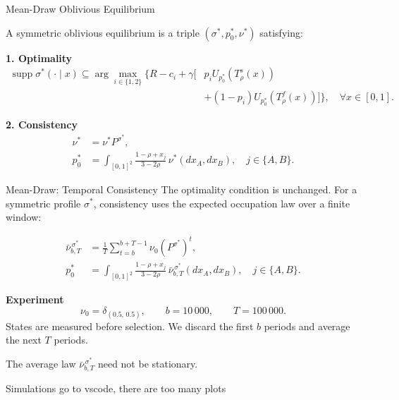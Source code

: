 \documentclass[10pt]{beamer}
\begin{document}
\begin{frame}{Mean-Draw Oblivious Equilibrium}

    A symmetric oblivious equilibrium is a triple
    $(\sigma^*,p_0^*,\nu^*)$ satisfying:

    \medskip
    \textbf{1. Optimality}
    \begin{equation*}
        \begin{aligned}
            \operatorname{supp}\sigma^*(\cdot\mid x)
            \subseteq
            \arg\max_{i\in\{1,2\}}
            \Big\{
            R-c_i+\gamma\big[
            &p_iU_{p_0^*}(T_\rho^s(x))\\
            &+(1-p_i)U_{p_0^*}(T_\rho^f(x))
            \big]
            \Big\},
            \quad \forall x\in[0,1].
            \end{aligned}
            \end{equation*}

            \medskip
            \textbf{2. Consistency}
            \begin{equation*}
            \begin{aligned}
            \nu^*&=\nu^*P^{\sigma^*},\\[6pt]
            p_0^*
            &=
            \int_{[0,1]^2}
            \frac{1-\rho+x_j}{3-2\rho}
            \,\nu^*(dx_A,dx_B),
            \quad j\in\{A,B\}.
        \end{aligned}
    \end{equation*}

\end{frame}

\begin{frame}{Mean-Draw: Temporal Consistency}
    The optimality condition is unchanged. For a symmetric profile
    $\sigma^*$, consistency uses the expected occupation law over a
    finite window:

    \medskip
    \begin{equation*}
        \begin{aligned}
            \bar{\nu}_{b,T}^{\,\sigma^*}
            &=\frac{1}{T}\sum_{t=b}^{b+T-1}
            \nu_0\left(P^{\sigma^*}\right)^t,\\[8pt]
            p_0^*
            &=\int_{[0,1]^2}
            \frac{1-\rho+x_j}{3-2\rho}
            \,\bar{\nu}_{b,T}^{\,\sigma^*}(dx_A,dx_B),
            \quad j\in\{A,B\}.
        \end{aligned}
    \end{equation*}

    \medskip
    \textbf{Experiment}
    \[
        \nu_0=\delta_{(0.5,\,0.5)},\qquad
        b=10\,000,\qquad T=100\,000.
    \]
    States are measured before selection. We discard the first $b$
    periods and average the next $T$ periods.

    \medskip
    The average law $\bar{\nu}_{b,T}^{\,\sigma^*}$ need not be stationary.
\end{frame}

\begin{frame}{Simulations}
    go to vscode, there are too many plots 
\end{frame}
\end{document}
